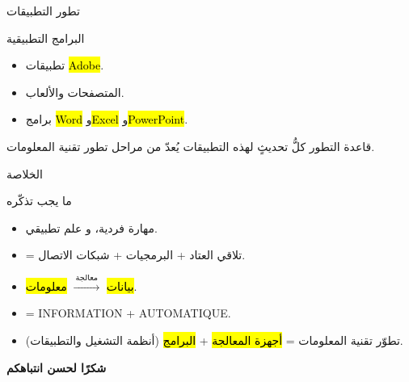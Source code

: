 \documentclass[aspectratio=169, 11pt]{beamer}
\begin{document}
\begin{frame}{تطور التطبيقات}
  \begin{block}{البرامج التطبيقية}
    \begin{itemize}
      \item تطبيقات \hl{Adobe}.
      \item المتصفحات والألعاب.
      \item برامج \hl{Word} و\hl{Excel} و\hl{PowerPoint}.
    \end{itemize}
  \end{block}
  \vspace{6pt}
  \begin{block}{قاعدة التطور}
    كلُّ تحديثٍ لهذه التطبيقات يُعدّ  من مراحل تطور تقنية المعلومات.
  \end{block}
\end{frame}

\begin{frame}{الخلاصة}
  \begin{block}{ما يجب تذكّره}
    \begin{itemize}
      \item {} مهارة فردية، و علم تطبيقي.
      \item {} = تلاقي العتاد + البرمجيات + شبكات الاتصال.
      \item \hl{بيانات} $\xrightarrow{\ \text{معالجة}\ }$ \hl{معلومات}.
      \item {} = INFORMATION + AUTOMATIQUE.
      \item تطوّر تقنية المعلومات = \hl{أجهزة المعالجة} + \hl{البرامج} (أنظمة التشغيل والتطبيقات).
    \end{itemize}
  \end{block}
\end{frame}

\begin{frame}[plain]
  \vfill
  \begin{center}
    {\color{primary}\Huge\bfseries شكرًا لحسن انتباهكم}
  \end{center}
  \vfill
\end{frame}
\end{document}
